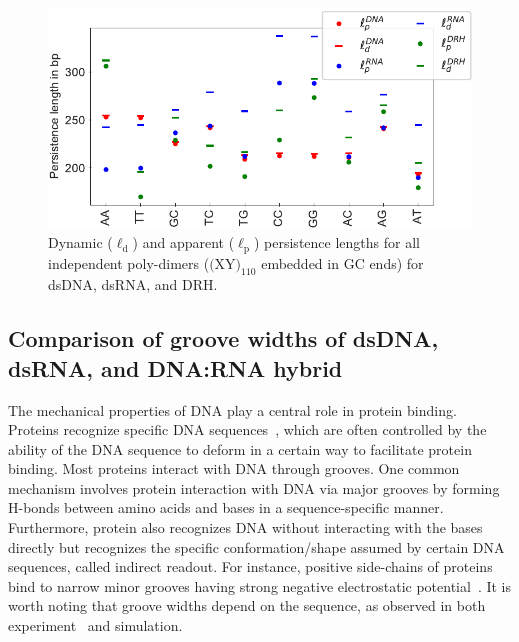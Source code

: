 \begin{figure}[H]
\begin{center}
\centering\includegraphics[scale=0.85]{images/persistence_length_sp.pdf}
\end{center}
\vspace{-0.5cm}
\centering\caption{
 Dynamic ($\ell_\text{d}$) and apparent ($\ell_\text{p}$) persistence lengths for all independent poly-dimers ($\text{(XY)}_{110}$ embedded in GC ends) for dsDNA, dsRNA, and DRH.
}
\label{c4:fig7_persis_dim}
\end{figure}

\subsection{Comparison of groove widths of dsDNA, dsRNA, and DNA:RNA hybrid} \label{c4:s5sb4}

The mechanical properties of DNA play a central role in protein binding.
Proteins recognize specific DNA sequences~\cite{jones1999protein,nekludova1994distinctive,rohs2009role,rohs2010origins}, which are often controlled by the ability of the DNA sequence to deform in a certain way to facilitate protein binding. 
Most proteins interact with DNA through grooves. 
One common mechanism involves protein interaction with DNA via major grooves by forming H-bonds between amino acids and bases in a sequence-specific manner.
Furthermore, protein also recognizes DNA without interacting with the bases directly but recognizes the specific conformation/shape assumed by certain DNA sequences, called indirect readout.
For instance, positive side-chains of proteins bind to narrow minor grooves having strong negative electrostatic potential~\cite{rohs2010origins}.
It is worth noting that groove widths depend on the sequence, as observed in both experiment~\cite{rohs2009role,oguey2010understanding,stofer1994measuring} and simulation. 

